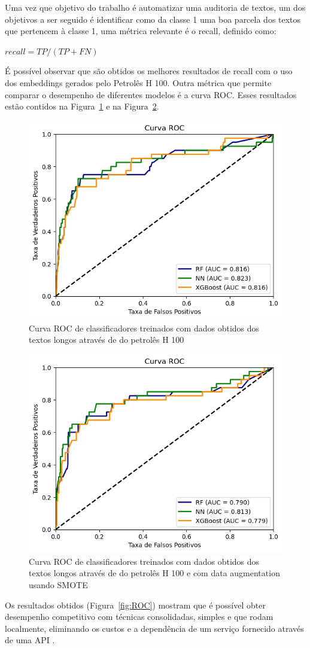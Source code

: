 \documentclass[conference]{IEEEtran}
\begin{document}
Uma vez que objetivo do trabalho é automatizar uma auditoria de textos, um dos objetivos a ser seguido é identificar como da classe 1 uma boa parcela dos textos que pertencem à classe 1, uma métrica relevante é o recall, definido como:


\(recall = TP/(TP + FN)\)


É possível observar que são obtidos os melhores resultados de recall com o uso dos embeddings gerados pelo Petrolês H 100. Outra métrica que permite comparar o desempenho de diferentes modelos é a curva ROC. Esses resultados estão contidos na Figura~\ref{fig:petrolesh100} e na Figura~\ref{fig:petrolesh100-sm}.

  \begin{figure}[ht]
  \centering
  \includegraphics[width=.5\textwidth]{petrolesh100.png}
  \caption{Curva ROC de classificadores treinados com dados obtidos dos textos longos através de do petrolês H 100}
  \label{fig:petrolesh100}
  \end{figure}

  \begin{figure}[ht]
  \centering
  \includegraphics[width=.5\textwidth]{petrolesh100-sm.png}
  \caption{Curva ROC de classificadores treinados com dados obtidos dos textos longos através de do petrolês H 100 e com data augmentation usando SMOTE}
  \label{fig:petrolesh100-sm}
  \end{figure}

  Os resultados obtidos (Figura~\ref{fig:ROC}) mostram que é possível obter desempenho competitivo com técnicas consolidadas, simples e que rodam localmente, eliminando os custos e a dependência de um serviço fornecido através de uma API \cite{neelakantan2022text}.
\end{document}
